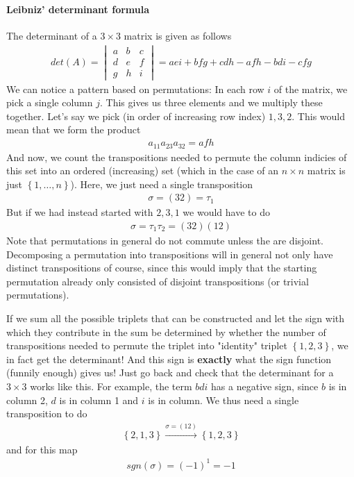 \paragraph{Leibniz' determinant formula}
The determinant of a \(3\times3\) matrix is given as follows \begin{align*}
    det(A) = \begin{vmatrix}
        a & b & c\\
        d & e & f\\
        g & h & i
    \end{vmatrix} = aei + bfg + cdh - afh - bdi - cfg
\end{align*} 
We can notice a pattern based on permutations: In each row \(i\) of the matrix, we pick a single column \(j\). This gives us three elements and we multiply these together. Let's say we pick (in order of increasing row index) \(1,3,2\). This would mean that we form the product \begin{align*}
    a_{11}a_{23}a_{32} = afh   
\end{align*}
And now, we count the transpositions needed to permute the column indicies of this set into an ordered (increasing) set (which in the case of an \(n\times n\) matrix is just \(\left\{ 1, \dots , n \right\} \)). Here, we just need a single transposition \begin{align*}
    \sigma = (32) = \tau _1
\end{align*}
But if we had instead started with \(2, 3, 1\) we would have to do \begin{align*}
    \sigma = \tau _1 \tau _2 = (32)(12)
\end{align*} 
Note that permutations in general do not commute unless the are disjoint. Decomposing a permutation into transpositions will in general not only have distinct transpositions of course, since this would imply that the starting permutation already only consisted of disjoint transpositions (or trivial permutations).

If we sum all the possible triplets that can be constructed and let the sign with which they contribute in the sum be determined by whether the number of transpositions needed to permute the triplet into "identity" triplet \(\left\{ 1, 2, 3 \right\} \), we in fact get the determinant! And this sign is \textbf{exactly} what the sign function (funnily enough) gives us! Just go back and check that the determinant for a \(3 \times 3\) works like this. For example, the term \(bdi\) has a negative sign, since \(b\) is in column 2, \(d\) is in column 1 and \(i\) is in column. We thus need a single transposition to do \begin{align*}
    \left\{ 2, 1, 3 \right\} \stackrel{\sigma = (12)}{\longrightarrow} \left\{ 1, 2, 3 \right\} 
\end{align*}
and for this map \begin{align*}
    sgn(\sigma ) = (-1)^1 = -1
\end{align*}


